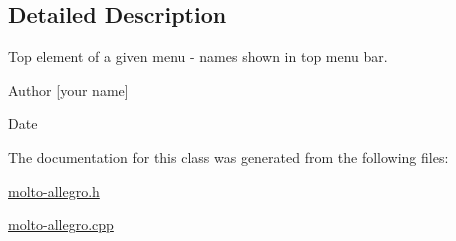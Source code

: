 \subsection{Detailed Description}
Top element of a given menu -\/ names shown in top menu bar. 

\begin{DoxyAuthor}{Author}
\mbox{[}your name\mbox{]} 
\end{DoxyAuthor}
\begin{DoxyDate}{Date}

\end{DoxyDate}


The documentation for this class was generated from the following files\-:\begin{DoxyCompactItemize}
\item 
\hyperlink{molto-allegro_8h}{molto-\/allegro.\-h}\item 
\hyperlink{molto-allegro_8cpp}{molto-\/allegro.\-cpp}\end{DoxyCompactItemize}
